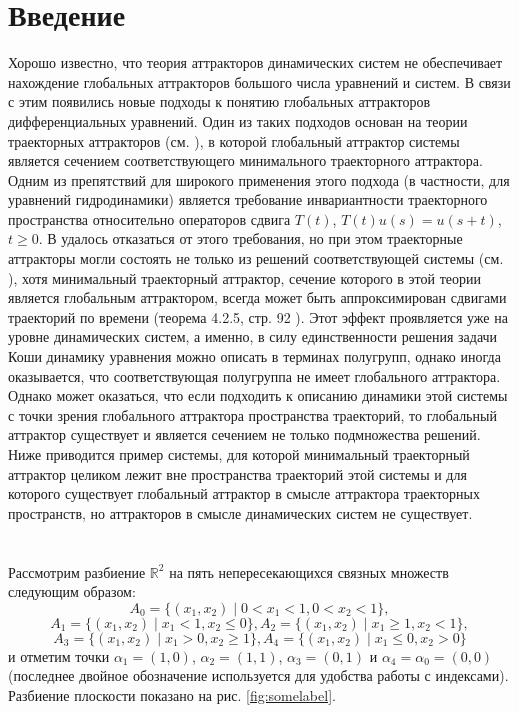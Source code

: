 \section{Введение}

Хорошо известно, что теория аттракторов динамических систем не обеспечивает нахождение глобальных аттракторов
большого числа уравнений и систем.
В связи с этим появились новые подходы к понятию глобальных аттракторов дифференциальных уравнений.
Один из таких подходов основан на теории траекторных аттракторов (см. \cite{Chepyzhov, Sell, Vorotnikov2, Zvyagin}),
в которой глобальный аттрактор системы является сечением соответствующего минимального траекторного аттрактора.
Одним из препятствий для широкого применения этого подхода (в частности, для уравнений гидродинамики)
является требование инвариантности траекторного пространства относительно операторов сдвига
$T(t)$, $T(t)u(s) = u(s+t)$, $t\geq 0$.
В \cite{Vorotnikov2, Zvyagin} удалось отказаться от этого требования,
но при этом траекторные аттракторы могли состоять  не только из решений соответствующей системы (см. \cite{Sell5}),
хотя минимальный траекторный аттрактор, сечение которого в этой теории является глобальным аттрактором,
всегда может быть аппроксимирован сдвигами траекторий по времени (теорема 4.2.5, стр. 92 \cite{Zvyagin}).
Этот эффект проявляется уже на уровне динамических систем, а именно,
в силу единственности решения задачи Коши динамику уравнения можно описать в терминах полугрупп,
однако иногда оказывается, что соответствующая полугруппа не имеет глобального аттрактора.
Однако может оказаться,
что если подходить к описанию динамики этой системы с точки зрения глобального аттрактора пространства траекторий,
то глобальный аттрактор существует
и является сечением не только подмножества решений.
Ниже приводится пример
системы, для которой минимальный траекторный аттрактор целиком лежит вне пространства траекторий этой системы
и для которого существует глобальный аттрактор в смысле
аттрактора траекторных пространств,
но аттракторов в смысле динамических систем не существует.

\section{}
Рассмотрим разбиение  $\mathbb{R}^2$ на пять непересекающихся связных множеств следующим образом:
$$
	A_0 = \{ (x_1, x_2) \mid 0 < x_1 < 1, 0 < x_2 < 1\},
$$
$$
	A_1 = \{ (x_1, x_2) \mid x_1 < 1, x_2 \leq 0  \},
	A_2 = \{ (x_1, x_2) \mid x_1 \geq 1, x_2 < 1  \},
$$
$$
	A_3 = \{ (x_1, x_2) \mid x_1 > 0, x_2 \geq 1  \},
	A_4 = \{ (x_1, x_2) \mid x_1 \leq 0, x_2 > 0  \}
$$
и отметим точки
$\alpha_1=(1, 0)$,
$\alpha_2=(1, 1)$,
$\alpha_3=(0, 1)$ и
$\alpha_4=\alpha_0=(0, 0)$
(последнее двойное обозначение используется для удобства работы с индексами).
Разбиение плоскости показано на рис. \ref{fig:somelabel}.

